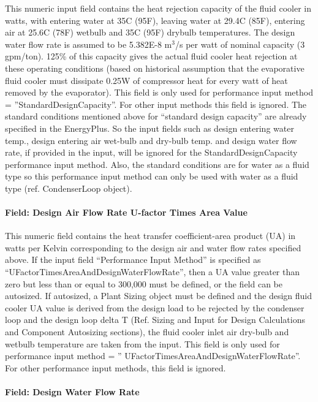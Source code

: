 This numeric input field contains the heat rejection capacity of the fluid cooler in watts, with entering water at 35C (95F), leaving water at 29.4C (85F), entering air at 25.6C (78F) wetbulb and 35C (95F) drybulb temperatures. The design water flow rate is assumed to be 5.382E-8 m\(^{3}\)/s per watt of nominal capacity (3 gpm/ton). 125\% of this capacity gives the actual fluid cooler heat rejection at these operating conditions (based on historical assumption that the evaporative fluid cooler must dissipate 0.25W of compressor heat for every watt of heat removed by the evaporator). This field is only used for performance input method = ''StandardDesignCapacity''. For other input methods this field is ignored. The standard conditions mentioned above for ``standard design capacity'' are already specified in the EnergyPlus. So the input fields such as design entering water temp., design entering air wet-bulb and dry-bulb temp. and design water flow rate, if provided in the input, will be ignored for the StandardDesignCapacity performance input method. Also, the standard conditions are for water as a fluid type so this performance input method can only be used with water as a fluid type (ref. CondenserLoop object).

\paragraph{Field: Design Air Flow Rate U-factor Times Area Value}\label{field-design-air-flow-rate-u-factor-times-area-value-1}

This numeric field contains the heat transfer coefficient-area product (UA) in watts per Kelvin corresponding to the design air and water flow rates specified above. If the input field ``Performance Input Method'' is specified as ``UFactorTimesAreaAndDesignWaterFlowRate'', then a UA value greater than zero but less than or equal to 300,000 must be defined, or the field can be autosized. If autosized, a Plant Sizing object must be defined and the design fluid cooler UA value is derived from the design load to be rejected by the condenser loop and the design loop delta T (Ref. Sizing and Input for Design Calculations and Component Autosizing sections), the fluid cooler inlet air dry-bulb and wetbulb temperature are taken from the input. This field is only used for performance input method = '' UFactorTimesAreaAndDesignWaterFlowRate''. For other performance input methods, this field is ignored.

\paragraph{Field: Design Water Flow Rate}\label{field-design-water-flow-rate-4}


